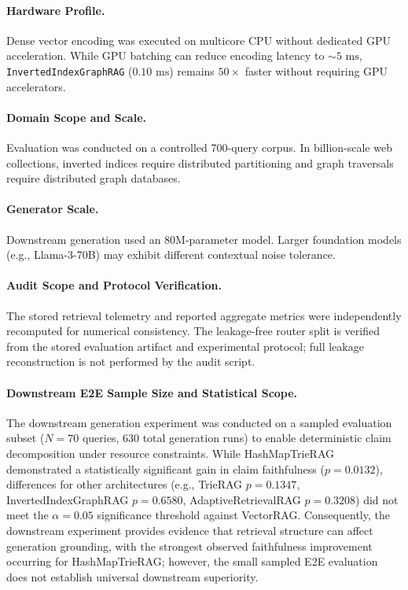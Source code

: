\documentclass[10pt,twocolumn,letterpaper]{article}
\begin{document}
\paragraph{Hardware Profile.} Dense vector encoding was executed on multicore CPU without dedicated GPU acceleration. While GPU batching can reduce encoding latency to $\sim 5\text{ ms}$, \texttt{InvertedIndexGraphRAG} ($0.10\text{ ms}$) remains $50\times$ faster without requiring GPU accelerators.
\paragraph{Domain Scope and Scale.} Evaluation was conducted on a controlled 700-query corpus. In billion-scale web collections, inverted indices require distributed partitioning and graph traversals require distributed graph databases.
\paragraph{Generator Scale.} Downstream generation used an 80M-parameter model. Larger foundation models (e.g., Llama-3-70B) may exhibit different contextual noise tolerance.
\paragraph{Audit Scope and Protocol Verification.} The stored retrieval telemetry and reported aggregate metrics were independently recomputed for numerical consistency. The leakage-free router split is verified from the stored evaluation artifact and experimental protocol; full leakage reconstruction is not performed by the audit script.
\paragraph{Downstream E2E Sample Size and Statistical Scope.} The downstream generation experiment was conducted on a sampled evaluation subset ($N = 70$ queries, 630 total generation runs) to enable deterministic claim decomposition under resource constraints. While HashMapTrieRAG demonstrated a statistically significant gain in claim faithfulness ($p = 0.0132$), differences for other architectures (e.g., TrieRAG $p=0.1347$, InvertedIndexGraphRAG $p=0.6580$, AdaptiveRetrievalRAG $p=0.3208$) did not meet the $\alpha=0.05$ significance threshold against VectorRAG. Consequently, the downstream experiment provides evidence that retrieval structure can affect generation grounding, with the strongest observed faithfulness improvement occurring for HashMapTrieRAG; however, the small sampled E2E evaluation does not establish universal downstream superiority.
\end{document}
